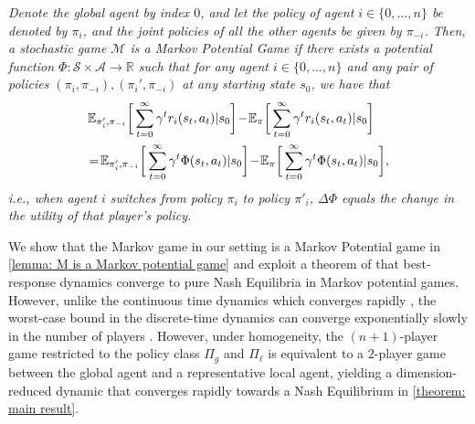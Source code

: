 \begin{definition} \emph{Denote the global agent by index $0$, and let the policy of agent $i\in\{0,\dots,n\}$ be denoted by $\pi_i$, and the joint policies of all the other agents be given by $\pi_{-i}$. Then, a stochastic game $\mathcal{M}$ is a Markov Potential Game if there exists a potential function $\Phi:\mathcal{S}\times\mathcal{A}\to\mathbb{R}$ such that for any agent $i\in\{0,\dots,n\}$ and any pair of policies $(\pi_i, \pi_{-i}), (\pi_i', \pi_{-i})$ at any starting state $s_0$, we have that
\begin{align*}&\mathbb{E}_{\pi'_i,\pi_{-i}}\bigg[\sum_{t=0}^\infty \gamma^t r_i(s_t,a_t) | s_0\bigg]\!-\! \mathbb{E}_{\pi}\bigg[\sum_{t=0}^\infty \gamma^t r_i(s_t,a_t) | s_0\bigg] \\
&\!=\! \mathbb{E}_{\pi'_i,\pi_{-i}}\bigg[\sum_{t=0}^\infty \gamma^t \Phi(s_t,a_t)| s_0\bigg]\!-\! \mathbb{E}_{\pi}\bigg[\sum_{t=0}^\infty \gamma^t \Phi(s_t,a_t)|s_0\bigg],
\end{align*}
i.e., when agent $i$ switches from policy $\pi_i$ to policy $\pi'_{i}$, $\Delta\Phi$ equals the change in the utility of that player's policy.}
\end{definition}

We show that the Markov game in our setting is a {Markov Potential game} in \cref{lemma: M is a Markov potential game} and exploit a theorem of \citet{doi:10.1073/pnas.39.10.1095} that best-response dynamics converge to pure Nash Equilibria in Markov potential games. However, unlike the continuous time dynamics which converges rapidly \cite{doi:10.1137/17M1139461}, the worst-case bound in the discrete-time dynamics can converge exponentially slowly in the number of players \cite{DurandGaujal:2016:ACBRA}. However, under homogeneity, the $(n+1)$-player game restricted to the policy class $\Pi_g$ and $\Pi_\ell$ is equivalent to a $2$-player game between the global agent and a representative local agent, yielding a dimension-reduced dynamic that converges rapidly towards a Nash Equilibrium in \cref{theorem: main result}.

